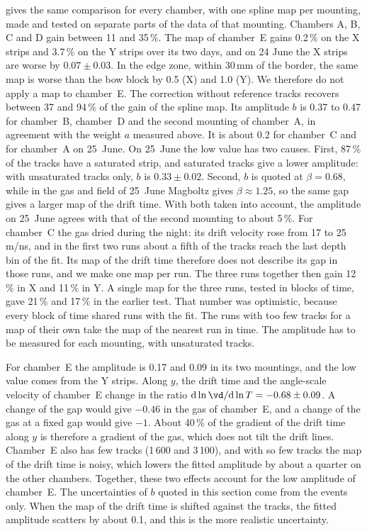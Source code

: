  gives the same comparison for every chamber, with one spline map per mounting, made and tested on
separate parts of the data of that mounting. Chambers A, B, C and D gain between 11 and 35\,\%. The map of chamber~E gains 0.2\,\% on the X strips and
3.7\,\% on the Y strips over its two days, and on 24 June the X strips are worse by $0.07\pm0.03$\textdegree. In the
edge zone, within 30\,mm of the border, the same map is worse than the bow block by 0.5\textdegree{} (X) and
1.0\textdegree{} (Y). We therefore do not apply a map to chamber~E. The correction without reference tracks
recovers between 37 and 94\,\% of the gain of the spline map.
Its amplitude $b$ is 0.37 to 0.47 for chamber~B, chamber~D and the second mounting of chamber~A, in agreement with the
weight $a$ measured above. It is about 0.2 for chamber~C and for chamber~A on 25~June. On 25~June the low value has
two causes. First, 87\,\% of the tracks have a saturated strip, and saturated tracks give a lower amplitude: with
unsaturated tracks only, $b$ is $0.33\pm0.02$. Second, $b$ is quoted at $\beta=0.68$, while in the gas and field of
25~June Magboltz gives $\beta\approx1.25$, so the same gap gives a larger map of the drift time. With both taken into
account, the amplitude on 25~June agrees with that of the second mounting to about 5\,\%. For chamber~C the gas dried during the night: its drift
velocity rose from 17 to 25\,\textmu m/ns, and in the first two runs about a fifth of the tracks reach the last
depth bin of the fit. Its map of the drift time therefore does not describe its gap in those runs, and we make one map
per run. The three runs together then gain 12\,\% in X and 11\,\% in Y. A single map for the three runs, tested
in blocks of time, gave 21\,\% and 17\,\% in the earlier test. That number was optimistic, because every block of
time shared runs with the fit. The runs with too few tracks for a map of their own take the map of the nearest run in
time. The amplitude has to be measured for each mounting, with
unsaturated tracks.

For chamber~E the amplitude is 0.17 and 0.09 in its two mountings, and the low value comes from the Y strips. Along
$y$, the drift time and the angle-scale velocity of chamber~E change in the ratio
$\mathrm{d}\ln\vd/\mathrm{d}\ln T=-0.68\pm0.09$. A change of the gap would give $-0.46$ in the gas of chamber~E, and a
change of the gas at a fixed gap would give $-1$. About 40\,\% of the gradient of the drift time along $y$ is therefore
a gradient of the gas, which does not tilt the drift lines. Chamber~E also has few tracks (1\,600 and 3\,100), and
with so few tracks the map of the drift time is noisy, which lowers the fitted amplitude by about a quarter on the
other chambers. Together, these two effects account for the low amplitude of chamber~E. The uncertainties of $b$ quoted
in this section come from the events only. When the map of the drift time is shifted against the tracks, the fitted
amplitude scatters by about 0.1, and this is the more realistic uncertainty.

